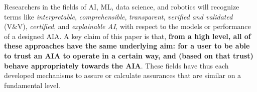    Researchers in the fields of AI, ML, data science, and robotics will recognize terms like \emph{interpretable}, \emph{comprehensible}, \emph{transparent}, \emph{verified and validated} (V\&V), \emph{certified}, and \emph{explainable AI}, with respect to the models or performance of a designed AIA. A key claim of this paper is that, \textbf{from a high level, all of these approaches have the same underlying aim: for a user to be able to trust an AIA to operate in a certain way, and (based on that trust) behave appropriately towards the AIA}. These fields have thus each developed mechanisms to assure or calculate assurances that are similar on a fundamental level. 
